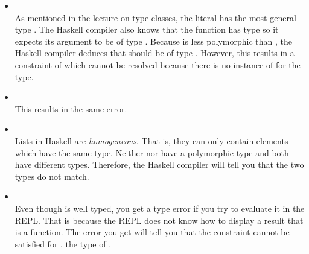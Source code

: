 \taskLine

\begin{itemize}
\item {} \\
As mentioned in the lecture on type classes, the literal  has the most general type . The Haskell compiler also knows that the  function has type  so it expects its argument to be of type . Because  is less polymorphic than , the Haskell compiler deduces that  should be of type . However, this results in a constraint of  which cannot be resolved because there is no instance of  for the  type.
\item \haskellIn{[1,True,3]} \\
This results in the same error.
\item \haskellIn{['a', False]} \\
Lists in Haskell are \emph{homogeneous}. That is, they can only contain elements which have the same type. Neither  nor  have a polymorphic type and both have different types. Therefore, the Haskell compiler will tell you that the two types do not match.
\end{itemize}

\taskLine

\begin{itemize}
\item {} \\
Even though  is well typed, you get a type error if you try to evaluate it in the REPL. That is because the REPL does not know how to display a result that is a function. The error you get will tell you that the  constraint cannot be satisfied for , the type of . 
\end{itemize}
